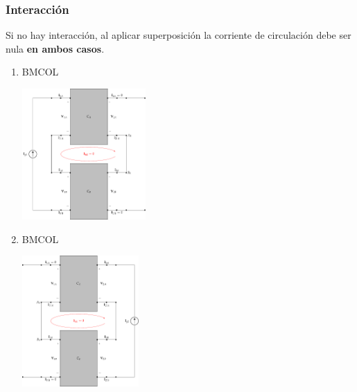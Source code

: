 \subsubsection{Interacción}
\label{sec:org45b1cf7}
Si no hay interacción, al aplicar superposición la corriente de circulación debe ser nula \textbf{en ambos casos}.
\begin{enumerate}
\item \hfill{}\textsc{BMCOL}
\label{sec:org7b3b505}
\begin{center}
\includegraphics[height=5cm]{../figs/serie-serie-superposicion-entrada.pdf}
\end{center}
\item \hfill{}\textsc{BMCOL}
\label{sec:orgfc7026f}
\begin{center}
\includegraphics[height=5cm]{../figs/serie-serie-superposicion-salida.pdf}
\end{center}
\end{enumerate}

